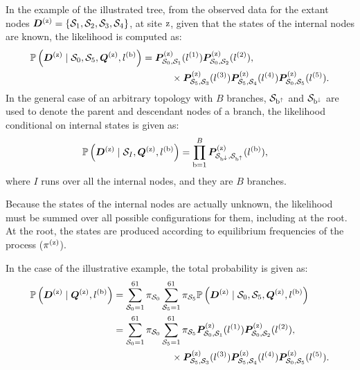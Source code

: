 In the example of the illustrated tree, from the observed data for the extant nodes $\bm{D}^{(\text{z})} = \{ \mathcal{S}_1,\mathcal{S}_2, \mathcal{S}_3, \mathcal{S}_4 \}$, at site $\text{z}$, given that the states of the internal nodes are known, the likelihood is computed as:
\begin{align}
    \mathbb{P} \left(\bm{D}^{(\text{z})} \mid \mathcal{S}_0, \mathcal{S}_5, \bm{Q}^{(\text{z})}, l^{(\text{b})} \right) & = \bm{P}^{(\text{z})}_{\mathcal{S}_0, \mathcal{S}_1}(l^{(1)})
    \bm{P}^{(\text{z})}_{\mathcal{S}_0, \mathcal{S}_2}(l^{(2)}), \\
    & \quad \quad \quad
    \times \bm{P}^{(\text{z})}_{\mathcal{S}_5, \mathcal{S}_3}(l^{(3)})
    \bm{P}^{(\text{z})}_{\mathcal{S}_5, \mathcal{S}_4}(l^{(4)})
    \bm{P}^{(\text{z})}_{\mathcal{S}_0, \mathcal{S}_5}(l^{(5)}). \notag
\end{align}
In the general case of an arbitrary topology with $B$ branches, $\mathcal{S}_{\text{b}^{\uparrow}}$ and $\mathcal{S}_{\text{b}^{\downarrow}}$ are used to denote the parent and descendant nodes of a branch, the likelihood conditional on internal states is given as:
\begin{align}
    \mathbb{P} \left(\bm{D}^{(\text{z})} \mid \mathcal{S}_{I}, \bm{Q}^{(\text{z})}, l^{(\text{b})} \right) & = \prod\limits_{\text{b}=1}^{B} \bm{P}^{(\text{z})}_{\mathcal{S}_{\text{b}^{\downarrow}}, \mathcal{S}_{\text{b}^{\uparrow}}}(l^{(\text{b})}),
\end{align}
where $I$ runs over all the internal nodes, and they are $B$ branches.

Because the states of the internal nodes are actually unknown, the likelihood must be summed over all possible configurations for them, including at the root.
At the root, the states are produced according to equilibrium frequencies of the process ($\pi^{(\text{z})}$).

In the case of the illustrative example, the total probability is given as:
\begin{align}
    \mathbb{P} \left(\bm{D}^{(\text{z})} \mid \bm{Q}^{(\text{z})}, l^{(\text{b})}  \right) & = \sum\limits_{\mathcal{S}_0=1}^{61} \pi_{\mathcal{S}_0} \sum\limits_{\mathcal{S}_5=1}^{61} \pi_{\mathcal{S}_5} \mathbb{P} \left(\bm{D}^{(\text{z})} \mid \mathcal{S}_0, \mathcal{S}_5, \bm{Q}^{(\text{z})}, l^{(\text{b})} \right) \\
    & = \sum\limits_{\mathcal{S}_0=1}^{61} \pi_{\mathcal{S}_0} \sum\limits_{\mathcal{S}_5=1}^{61} \pi_{\mathcal{S}_5} \bm{P}^{(\text{z})}_{\mathcal{S}_0, \mathcal{S}_1}(l^{(1)})
    \bm{P}^{(\text{z})}_{\mathcal{S}_0, \mathcal{S}_2}(l^{(2)}), \\
    & \qquad \qquad \qquad
    \times \bm{P}^{(\text{z})}_{\mathcal{S}_5, \mathcal{S}_3}(l^{(3)})
    \bm{P}^{(\text{z})}_{\mathcal{S}_5, \mathcal{S}_4}(l^{(4)})
    \bm{P}^{(\text{z})}_{\mathcal{S}_0, \mathcal{S}_5}(l^{(5)}).\notag
\end{align}

